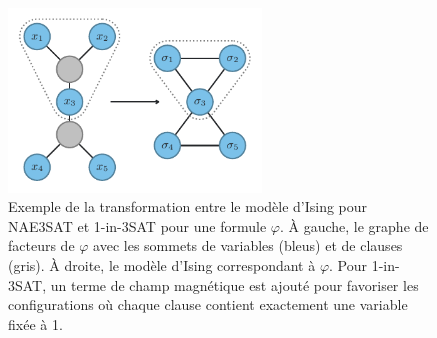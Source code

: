 \begin{figure}[h]
    \centering
    \includegraphics[width=0.6\textwidth]{figures/ising-mapping}
    \caption[Transformation du problème \#NAE3SAT et \#1-in-3SAT au modèle d'Ising]{Exemple de la transformation entre le modèle d'Ising pour NAE3SAT et 1-in-3SAT pour une formule $\varphi$. À gauche, le graphe de facteurs de $\varphi$ avec les sommets de variables (bleus) et de clauses (gris). À droite, le modèle d'Ising correspondant à $\varphi$. Pour 1-in-3SAT, un terme de champ magnétique est ajouté pour favoriser les configurations où chaque clause contient exactement une variable fixée à 1.}
    \label{fig:transformation-ising}
\end{figure}

